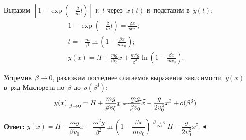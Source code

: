 \documentclass{weekly}
\begin{document}
Выразим~$\left[ 1 - \exp\left( -\frac{\beta}{m} t \right) \right]$
и~$t$ через~$x(t)$ и~подставим в~$y(t)$:
\begin{gather}
    1 - \exp\left( -\frac{\beta}{m} t \right)
        = \frac{\beta x}{m v_0}; \\
    t = -\frac{m}{\beta} \ln\left(1 - \frac{\beta x}{m v_0}\right); \\
    y(x) = H + \frac{mg}{\beta v_0} x +
            \frac{m^2 g}{\beta^2}
            \ln\left( 1 - \frac{\beta x}{m v_0}\right).
\end{gather}

Устремив~$\beta \to 0$, разложим последнее слагаемое
выражения зависимости~$y(x)$ в~ряд Маклорена по~$\beta$ до~$o(\beta^3)$:
\begin{equation}
    y(x)\big|_{\beta \to 0} = H + \cancel{\frac{mg}{\beta v_0} x -
            \frac{mg}{\beta v_0}x} - \frac{g}{2v_0^2}x^2 + o(\beta^3).
\end{equation}

\textbf{Ответ:}\quad
$y(x) = H + \dfrac{mg}{\beta v_0} x + \dfrac{m^2 g}{\beta^2}
\ln\left( 1 - \dfrac{\beta x}{m v_0}\right)
\stackrel{\beta \to 0}{\simeq} H - \dfrac{g}{2v_0^2}x^2$.
\hfill $\blacktriangleleft$
\end{document}
